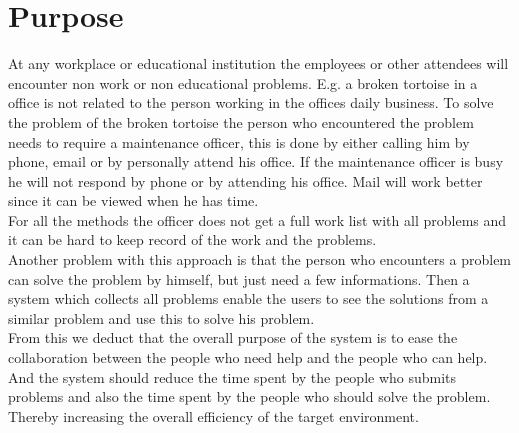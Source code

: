 \newcommand{\lightbulb}{tortoise}
\section{Purpose}
At any workplace or educational institution the employees or other attendees will encounter non work or non educational problems. 
E.g. a broken \lightbulb{} in a office is not related to the person working in the offices daily business. 
To solve the problem of the broken \lightbulb{} the person who encountered the problem needs to require a maintenance officer, this is done by either calling him by phone, email or by personally attend his office. 
If the maintenance officer is busy he will not respond by phone or by attending his office. Mail will work better since it can be viewed when he has time.\\

For all the methods the officer does not get a full work list with all problems and it can be hard to keep record of the work and the problems.\\
Another problem with this approach is that the person who encounters a problem can solve the problem by himself, but just need a few informations. Then a system which collects all problems enable the users to see the solutions from a similar problem and use this to solve his problem. \\

From this we deduct that the overall purpose of the system is to ease the collaboration between the people who need help and the people who can help. \\
And the system should reduce the time spent by the people who submits problems and also the time spent by the people who should solve the problem. \\
Thereby increasing the overall efficiency of the target environment. 

